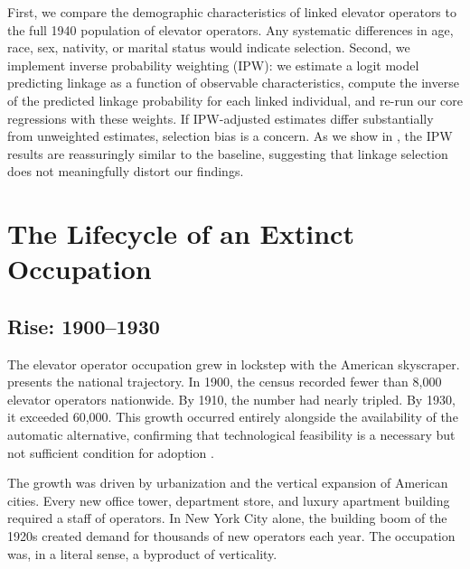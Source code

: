 \documentclass[12pt]{article}
\begin{document}
First, we compare the demographic characteristics of linked elevator operators to the full 1940 population of elevator operators. Any systematic differences in age, race, sex, nativity, or marital status would indicate selection. Second, we implement inverse probability weighting (IPW): we estimate a logit model predicting linkage as a function of observable characteristics, compute the inverse of the predicted linkage probability for each linked individual, and re-run our core regressions with these weights. If IPW-adjusted estimates differ substantially from unweighted estimates, selection bias is a concern. As we show in , the IPW results are reassuringly similar to the baseline, suggesting that linkage selection does not meaningfully distort our findings.



\section{The Lifecycle of an Extinct Occupation} \label{sec:lifecycle}

\subsection{Rise: 1900--1930}

The elevator operator occupation grew in lockstep with the American skyscraper.  presents the national trajectory. In 1900, the census recorded fewer than 8,000 elevator operators nationwide. By 1910, the number had nearly tripled. By 1930, it exceeded 60,000. This growth occurred entirely alongside the availability of the automatic alternative, confirming that technological feasibility is a necessary but not sufficient condition for adoption \citep{griliches1957, manuelli2014}.



The growth was driven by urbanization and the vertical expansion of American cities. Every new office tower, department store, and luxury apartment building required a staff of operators. In New York City alone, the building boom of the 1920s created demand for thousands of new operators each year. The occupation was, in a literal sense, a byproduct of verticality.
\end{document}
